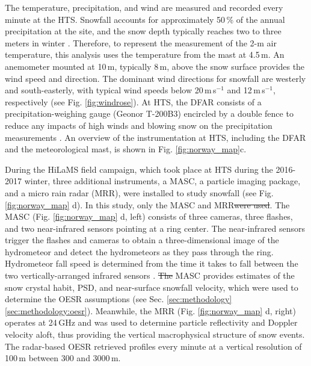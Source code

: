 \documentclass{ametsocV5}
\providecommand{\DIFadd}[1]{{\protect\color{blue}\uwave{#1}}} %
\providecommand{\DIFdel}[1]{{\protect\color{red}\sout{#1}}}                      %
\providecommand{\DIFaddbegin}{} %
\providecommand{\DIFaddend}{} %
\providecommand{\DIFdelbegin}{} %
\providecommand{\DIFdelend}{} %
\newcommand{\DIFscaledelfig}{0.5}
\newlength{\DIFdelgraphicswidth} %
\newlength{\DIFdelgraphicsheight} %
\newcommand{\DIFaddincludegraphics}[2][]{{\color{blue}\fbox{\DIFOincludegraphics[#1]{#2}}}} %
\newcommand{\DIFdelincludegraphics}[2][]{%
\sbox{\DIFdelgraphicsbox}{\DIFOincludegraphics[#1]{#2}}%
\settoboxwidth{\DIFdelgraphicswidth}{\DIFdelgraphicsbox} %
\settoboxtotalheight{\DIFdelgraphicsheight}{\DIFdelgraphicsbox} %
\scalebox{\DIFscaledelfig}{%
\parbox[b]{\DIFdelgraphicswidth}{\usebox{\DIFdelgraphicsbox}\\[-\baselineskip] \rule{\DIFdelgraphicswidth}{0em}}\llap{\resizebox{\DIFdelgraphicswidth}{\DIFdelgraphicsheight}{%
\setlength{\unitlength}{\DIFdelgraphicswidth}%
\begin{picture}(1,1)%
\thicklines\linethickness{2pt} %
{\color[rgb]{1,0,0}\put(0,0){\framebox(1,1){}}}%
{\color[rgb]{1,0,0}\put(0,0){\line( 1,1){1}}}%
{\color[rgb]{1,0,0}\put(0,1){\line(1,-1){1}}}%
\end{picture}%
}\hspace*{3pt}}} %
} %
\DeclareRobustCommand{\DIFaddbegin}{\DIFOaddbegin \let\includegraphics\DIFaddincludegraphics} %
\DeclareRobustCommand{\DIFaddend}{\DIFOaddend \let\includegraphics\DIFOincludegraphics} %
\DeclareRobustCommand{\DIFdelbegin}{\DIFOdelbegin \let\includegraphics\DIFdelincludegraphics} %
\DeclareRobustCommand{\DIFdelend}{\DIFOaddend \let\includegraphics\DIFOincludegraphics} %
\begin{document}
		The temperature, precipitation, and wind are measured and recorded every minute at the HTS. Snowfall accounts for approximately 50\,\% of the annual precipitation at the site, and the snow depth typically reaches two to three meters in winter \citep{wolff_derivation_2015}. Therefore, to represent the measurement of the 2-m air temperature, this analysis uses the temperature from the mast at 4.5\,m. An anemometer mounted at 10\,m, typically 8\,m, above the snow surface provides the wind speed and direction. The dominant wind directions for snowfall are westerly and south-easterly, with typical wind speeds below 20\,m\,s$^{-1}$ and 12\,m\,s$^{-1}$, respectively (see Fig. \ref{fig:windrose}). At HTS, the DFAR consists of a precipitation-weighing gauge (Geonor T-200B3) encircled by a double fence to reduce any impacts of high winds and blowing snow on the precipitation measurements \citep{goodison_wmo_1998}. An overview of the instrumentation at HTS, including the DFAR and the meteorological mast, is shown in Fig. \ref{fig:norway_map}c. 

		During the HiLaMS field campaign, which took place at HTS during the 2016-2017 winter, three additional instruments, a MASC, a particle imaging package, and a micro rain radar (MRR), were installed to study snowfall (see Fig. \ref{fig:norway_map} d). In this study, \DIFaddbegin \DIFadd{the OESR algorithm uses }\DIFaddend only the MASC and MRR\DIFdelbegin \DIFdel{were used}\DIFdelend . The MASC (Fig. \ref{fig:norway_map} d, left) consists of three cameras, three flashes, and two near-infrared sensors pointing at a ring center. The near-infrared sensors trigger the flashes and cameras to obtain a three-dimensional image of the hydrometeor and detect the hydrometeors as they pass through the ring. Hydrometeor fall speed is determined from the time it takes to fall between the two vertically-arranged infrared sensors \citep{garrett_fall_2012}. %
		\DIFdelbegin \DIFdel{The }\DIFdelend \DIFaddbegin \DIFadd{In addition, the }\DIFaddend MASC provides estimates of the snow crystal habit, PSD, and near-surface snowfall velocity, which were used to determine the OESR assumptions (see Sec. \ref{sec:methodology}\ref{sec:methodology:oesr}). Meanwhile, the MRR (Fig. \ref{fig:norway_map} d, right) operates at 24\,GHz and was used to determine particle reflectivity and Doppler velocity aloft, thus providing the vertical macrophysical structure of snow events. The radar-based OESR retrieved profiles every minute at a vertical resolution of 100\,m between 300 and 3000\,m. 
\end{document}
